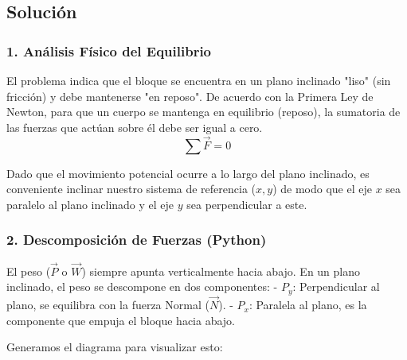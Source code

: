 \documentclass[12pt, a4paper]{article}
\begin{document}
\begin{center}
\end{center}

\subsection*{Solución}

\subsubsection*{1. Análisis Físico del Equilibrio}
El problema indica que el bloque se encuentra en un plano inclinado "liso" (sin fricción) y debe mantenerse "en reposo". De acuerdo con la Primera Ley de Newton, para que un cuerpo se mantenga en equilibrio (reposo), la sumatoria de las fuerzas que actúan sobre él debe ser igual a cero.
$$ \sum \vec{F} = 0 $$

Dado que el movimiento potencial ocurre a lo largo del plano inclinado, es conveniente inclinar nuestro sistema de referencia ($x, y$) de modo que el eje $x$ sea paralelo al plano inclinado y el eje $y$ sea perpendicular a este.

\subsubsection*{2. Descomposición de Fuerzas (Python)}
El peso ($\vec{P}$ o $\vec{W}$) siempre apunta verticalmente hacia abajo. En un plano inclinado, el peso se descompone en dos componentes:
- $P_y$: Perpendicular al plano, se equilibra con la fuerza Normal ($\vec{N}$).
- $P_x$: Paralela al plano, es la componente que empuja el bloque hacia abajo.

Generamos el diagrama para visualizar esto:
\end{document}
